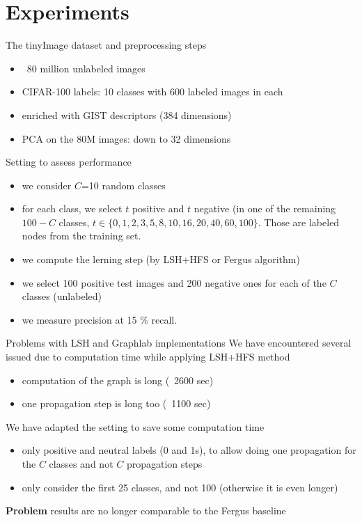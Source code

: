 \documentclass[11pt)]{beamer}
\begin{document}
\section{Experiments}
\begin{frame}{The tinyImage dataset and preprocessing steps}
\begin{itemize}
\item ~80 million unlabeled images
\item CIFAR-100 labels: 10 classes with 600 labeled images in each
\item enriched with GIST descriptors (384 dimensions)
\item PCA on the 80M images: down to 32 dimensions
\end{itemize}
\end{frame}

\begin{frame}{Setting to assess performance}
\begin{itemize}
\item we consider $C$=10 random classes
\item for each class, we select $t$ positive and $t$ negative (in one of the remaining $100-C$ classes, $t\in \{0, 1, 2, 3, 5, 8, 10, 16, 20, 40, 60, 100\}$. Those are labeled nodes from the training set.
\item we compute the lerning step (by LSH+HFS or Fergus algorithm)
\item we select 100 positive test images and 200 negative ones for each of the $C$ classes (unlabeled)
\item we measure precision at 15 \% recall.
\end{itemize}
\end{frame}

\begin{frame}{Problems with LSH and Graphlab implementations}
We have encountered several issued due to computation time while applying LSH+HFS method
\begin{itemize}
\item computation of the graph is long (~2600 sec)
\item one propagation step is long too (~1100 sec)
\end{itemize}
We have adapted the setting to save some computation time
\begin{itemize}
\item only positive and neutral labels (0 and 1s), to allow doing one propagation for the $C$ classes and not $C$ propagation steps
\item only consider the first 25 classes, and not 100 (otherwise it is even longer)
\end{itemize}

{\color{red}\textbf{Problem} results are no longer comparable to the Fergus baseline}

\end{frame}
\end{document}
